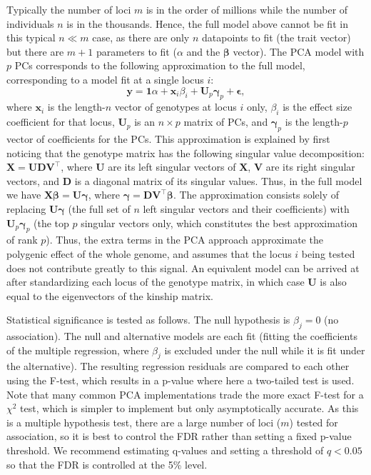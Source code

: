 \documentclass[12pt]{article}
\begin{document}
Typically the number of loci $m$ is in the order of millions while the number of individuals $n$ is in the thousands.
Hence, the full model above cannot be fit in this typical $n \ll m$ case, as there are only $n$ datapoints to fit (the trait vector) but there are $m+1$ parameters to fit ($\alpha$ and the $\mathbf{\beta}$ vector).
The PCA model with $p$ PCs corresponds to the following approximation to the full model, corresponding to a model fit at a single locus $i$:
$$
\mathbf{y}
=
\mathbf{1} \alpha + \mathbf{x}_i \beta_i + \mathbf{U}_p \mathbf{\gamma}_p + \mathbf{\epsilon}
,
$$
where $\mathbf{x}_i$ is the length-$n$ vector of genotypes at locus $i$ only,
$\beta_i$ is the effect size coefficient for that locus,
$\mathbf{U}_p$ is an $n \times p$ matrix of PCs, and
$\mathbf{\gamma}_p$ is the length-$p$ vector of coefficients for the PCs.
This approximation is explained by first noticing that the genotype matrix has the following singular value decomposition:
$\mathbf{X} = \mathbf{U} \mathbf{D} \mathbf{V}^\intercal$,
where
$\mathbf{U}$ are its left singular vectors of $\mathbf{X}$,
$\mathbf{V}$ are its right singular vectors, and
$\mathbf{D}$ is a diagonal matrix of its singular values.
Thus, in the full model we have
$\mathbf{X} \mathbf{\beta} = \mathbf{U} \mathbf{\gamma}$,
where
$\mathbf{\gamma} = \mathbf{D} \mathbf{V}^\intercal \mathbf{\beta}$.
The approximation consists solely of replacing $\mathbf{U} \mathbf{\gamma}$ (the full set of $n$ left singular vectors and their coefficients) with $\mathbf{U}_p \mathbf{\gamma}_p$ (the top $p$ singular vectors only, which constitutes the best approximation of rank $p$).
Thus, the extra terms in the PCA approach approximate the polygenic effect of the whole genome, and assumes that the locus $i$ being tested does not contribute greatly to this signal.
An equivalent model can be arrived at after standardizing each locus of the genotype matrix, in which case $\mathbf{U}$ is also equal to the eigenvectors of the kinship matrix.

Statistical significance is tested as follows.
The null hypothesis is $\beta_j = 0$ (no association).
The null and alternative models are each fit (fitting the coefficients of the multiple regression, where $\beta_j$ is excluded under the null while it is fit under the alternative).
The resulting regression residuals are compared to each other using the F-test, which results in a p-value where here a two-tailed test is used.
Note that many common PCA implementations trade the more exact F-test for a $\chi^2$ test, which is simpler to implement but only asymptotically accurate.
As this is a multiple hypothesis test, there are a large number of loci ($m$) tested for association, so it is best to control the FDR rather than setting a fixed p-value threshold.
We recommend estimating q-values and setting a threshold of $q < 0.05$ so that the FDR is controlled at the 5\% level.
\end{document}

